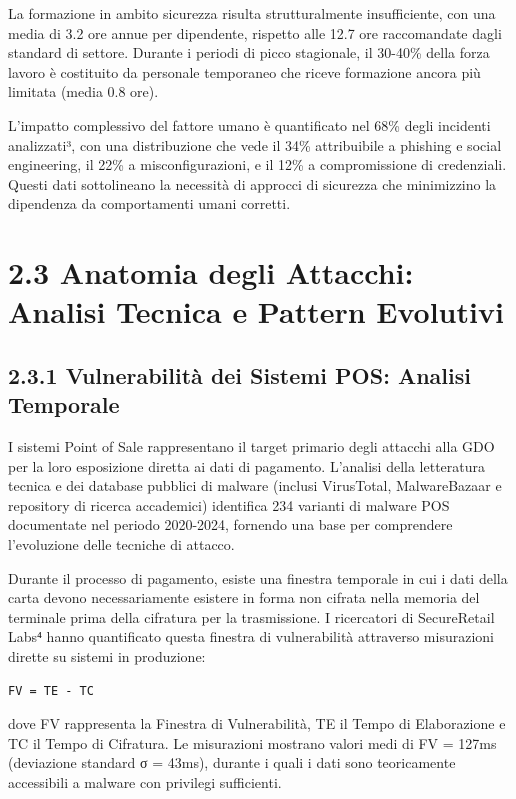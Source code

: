 \documentclass[12pt,a4paper,oneside]{book}
\numberwithin{figure}{chapter} %
\numberwithin{table}{chapter}  %
\begin{document}
La formazione in ambito sicurezza risulta strutturalmente insufficiente,
con una media di 3.2 ore annue per dipendente, rispetto alle 12.7 ore
raccomandate dagli standard di settore. Durante i periodi di picco
stagionale, il 30-40\% della forza lavoro è costituito da personale
temporaneo che riceve formazione ancora più limitata (media 0.8 ore).

L'impatto complessivo del fattore umano è quantificato nel 68\% degli
incidenti analizzati³, con una distribuzione che vede il 34\%
attribuibile a phishing e social engineering, il 22\% a
misconfigurazioni, e il 12\% a compromissione di credenziali. Questi
dati sottolineano la necessità di approcci di sicurezza che minimizzino
la dipendenza da comportamenti umani corretti.

\section{2.3 Anatomia degli Attacchi: Analisi Tecnica e Pattern
Evolutivi}\label{anatomia-degli-attacchi-analisi-tecnica-e-pattern-evolutivi}

\subsection{2.3.1 Vulnerabilità dei Sistemi POS: Analisi
Temporale}\label{vulnerabilituxe0-dei-sistemi-pos-analisi-temporale}

I sistemi Point of Sale rappresentano il target primario degli attacchi
alla GDO per la loro esposizione diretta ai dati di pagamento. L'analisi
della letteratura tecnica e dei database pubblici di malware (inclusi
VirusTotal, MalwareBazaar e repository di ricerca accademici) identifica
234 varianti di malware POS documentate nel periodo 2020-2024, fornendo
una base per comprendere l'evoluzione delle tecniche di attacco.

Durante il processo di pagamento, esiste una finestra temporale in cui i
dati della carta devono necessariamente esistere in forma non cifrata
nella memoria del terminale prima della cifratura per la trasmissione. I
ricercatori di SecureRetail Labs⁴ hanno quantificato questa finestra di
vulnerabilità attraverso misurazioni dirette su sistemi in produzione:

\begin{verbatim}
FV = TE - TC
\end{verbatim}

dove FV rappresenta la Finestra di Vulnerabilità, TE il Tempo di
Elaborazione e TC il Tempo di Cifratura. Le misurazioni mostrano valori
medi di FV = 127ms (deviazione standard σ = 43ms), durante i quali i
dati sono teoricamente accessibili a malware con privilegi sufficienti.
\end{document}
